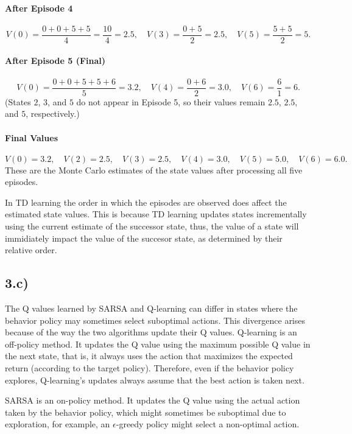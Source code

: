 \documentclass[11pt]{article}
\begin{document}
\paragraph{After Episode 4}
\[
V(0) = \frac{0 + 0 + 5 + 5}{4} = \frac{10}{4} = 2.5,\quad
V(3) = \frac{0 + 5}{2} = 2.5,\quad
V(5) = \frac{5 + 5}{2} = 5.
\]

\paragraph{After Episode 5 (Final)}
\[
V(0) = \frac{0 + 0 + 5 + 5 + 6}{5} = 3.2,\quad
V(4) = \frac{0 + 6}{2} = 3.0,\quad
V(6) = \frac{6}{1} = 6.
\]
(States $2$, $3$, and $5$ do not appear in Episode 5, so their values remain $2.5$, $2.5$, and $5$, respectively.)

\paragraph*{Final Values}
\[
\boxed{
  V(0) = 3.2,\quad
  V(2) = 2.5,\quad
  V(3) = 2.5,\quad
  V(4) = 3.0,\quad
  V(5) = 5.0,\quad
  V(6) = 6.0.
}
\]
These are the Monte Carlo estimates of the state values after processing all five episodes.

\begin{flushleft}
  In TD learning the order in which the episodes are observed does affect the estimated state values.
  This is because TD learning updates states incrementally using the current estimate of the successor state, thus, the value of a state
  will immidiately impact the value of the succesor state, as determined by their relative order.
\end{flushleft}

\subsection*{3.c)}
The Q values learned by SARSA and Q-learning can differ in states where the behavior policy may sometimes select suboptimal actions.
This divergence arises because of the way the two algorithms update their Q values. Q-learning is an off-policy method.
It updates the Q value using the maximum possible Q value in the next state, that is,
it always uses the action that maximizes the expected return (according to the target policy).
Therefore, even if the behavior policy explores, Q-learning’s updates always assume that the best action is taken next.

SARSA is an on-policy method. It updates the Q value using the actual action taken by the behavior policy, which might sometimes be suboptimal due to
exploration, for example, an $\epsilon$-greedy policy might select a non-optimal action.
\end{document}
